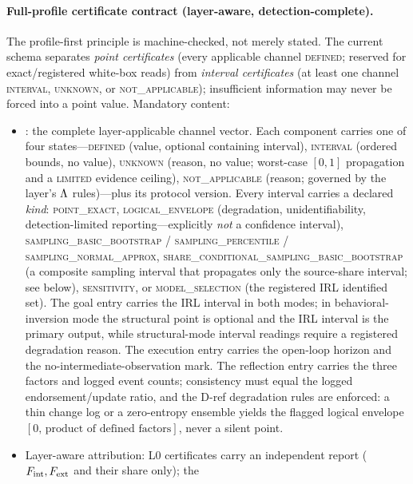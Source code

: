 \paragraph{Full-profile certificate contract (layer-aware, detection-complete).}
The profile-first principle is machine-checked, not merely stated. The
current schema separates \emph{point certificates} (every applicable channel
\textsc{defined}; reserved for exact/registered white-box reads) from
\emph{interval certificates} (at least one channel \textsc{interval},
\textsc{unknown}, or \textsc{not\_applicable}); insufficient information may
never be forced into a point value. Mandatory content:
\begin{sloppypar}
\begin{itemize}
\item {}: the complete layer-applicable channel vector.
Each component carries one of four states---\textsc{defined} (value, optional
containing interval), \textsc{interval} (ordered bounds, no value),
\textsc{unknown} (reason, no value; worst-case $[0,1]$ propagation and a
\textsc{limited} evidence ceiling), \textsc{not\_applicable} (reason; governed
by the layer's $\Lambda$ rules)---plus its protocol version. Every interval
carries a declared \emph{kind}: \textsc{point\_exact},
\textsc{logical\_envelope} (degradation, unidentifiability, detection-limited
reporting---explicitly \emph{not} a confidence interval),
\textsc{sampling\_basic\_bootstrap} / \textsc{sampling\_percentile} /
\textsc{sampling\_normal\_approx},
\textsc{share\_conditional\_sampling\_basic\_bootstrap} (a composite sampling
interval that propagates only the source-share interval; see below),
\textsc{sensitivity}, or \textsc{model\_selection} (the registered IRL
identified set). The goal entry
carries the IRL interval in both modes; in behavioral-inversion mode the
structural point is optional and the IRL interval is the primary output,
while structural-mode interval readings require a registered degradation
reason. The execution entry carries the open-loop horizon and the
no-intermediate-observation mark. The reflection entry carries the three
factors and logged event counts; consistency must equal the logged
endorsement/update ratio, and the D-ref degradation rules are enforced: a thin
change log or a zero-entropy ensemble yields the flagged logical envelope
$[0,\,\text{product of defined factors}]$, never a silent point.
\item Layer-aware attribution: L0 certificates carry an independent
 report ($F_{\mathrm{int}},F_{\mathrm{ext}}$ and their share only); the

\end{itemize}
\end{sloppypar}
